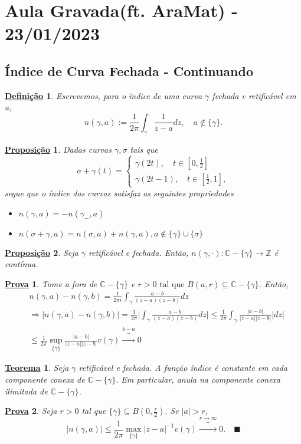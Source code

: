 \documentclass{article}
\newtheorem*{def*}{\underline{Defini\c c\~ao}}
\newtheorem*{theorem*}{\underline{Teorema}}
\newtheorem*{proof*}{\underline{Prova}}
\newtheorem*{prop*}{\underline{Proposi\c c\~ao}}
\renewcommand\qedsymbol{$\blacksquare$}
\begin{document}
\section{Aula Gravada(ft. AraMat) - 23/01/2023}
\subsection{\'Indice de Curva Fechada - Continuando}
\begin{def*}
  Escrevemos, para o \'indice de uma curva $\gamma$ fechada e retific\'avel em a, 
  $$
  n(\gamma, a):= \frac{1}{2\pi}\int_{\gamma}^{}\frac{1}{z-a}dz, \quad a\not\in \{\gamma\}.
  $$
\end{def*}
\begin{prop*}
  Dadas curvas $\gamma, \sigma$ tais que 
  $$
    \sigma + \gamma(t)  = \left\{\begin{array}{ll}
        \gamma(2t), \quad t\in[0, \frac{1}{2}] \\
        \gamma(2t-1), \quad t\in[\frac{1}{2}, 1],
      \end{array}\right.
  $$
  segue que o \'indice das curvas satisfaz as seguintes propriedades
 \begin{itemize}
   \item[i)] $n(\gamma, a) = -n(\gamma_{-}, a)$
   \item[ii)] $n(\sigma+\gamma, a) = n(\sigma, a) + n(\gamma, a), a\not\in \{\gamma\}\cup \{\sigma\}$
 \end{itemize}
\end{prop*}
\begin{prop*}
  Seja $\gamma$ retific\'avel e fechada. Ent\~ao, $n(\gamma, \cdot):\mathbb{C}-\{\gamma\} \rightarrow \mathbb{Z}$ \'e cont\'inua.
\end{prop*}
\begin{proof*}
  Tome a fora de $\mathbb{C}-\{\gamma\}$ e $r > 0\text{ tal que } B(a, r)\subseteq{\mathbb{C}-\{\gamma\}}$. Ent\~ao, 
  \begin{align*}
    &n(\gamma, a) - n(\gamma, b) = \frac{1}{2\pi i}\int_{\gamma}^{}\frac{a - b}{(z-a)(z-b)}dz\\
    &\Rightarrow|n(\gamma, a) - n(\gamma, b)| = \frac{1}{2\pi}\biggl|\int_{\gamma}^{}\frac{a-b}{(z-a)(z-b)}dz\biggr|\leq \frac{1}{2\pi}\int_{\gamma}^{}\frac{|a-b|}{|z-a||z-b|}|dz|\\
    &\leq\frac{1}{2\pi}\sup_{\{\gamma\} }\frac{|a-b|}{|z-a||z-b|}v(\gamma)\overbrace{\to}^{b-a}0
  \end{align*}
\end{proof*}
\begin{theorem*}
  Seja $\gamma$ retific\'avel e fechada. A fun\c c\~ao \'indice \'e constante em cada componente conexa de $\mathbb{C}-\{\gamma\}.$
  Em particular, anula na componente conexa ilimitada de $\mathbb{C}-\{\gamma\} $.
\end{theorem*}
\begin{proof*}
  Seja $r > 0$ tal que $\{\gamma\}\subseteq{B(0, \frac{r}{2})}.$ Se $|a| > r,$
  $$
  |n(\gamma, a)|\leq \frac{1}{2\pi}\max_{\{\gamma\}}|z-a|^{-1}v(\gamma)\overbrace{\to}^{r\to\infty}0. \quad\text{\qedsymbol}
  $$
\end{proof*}
\end{document}
